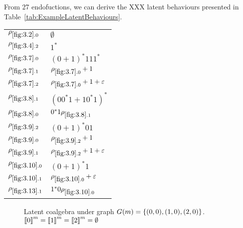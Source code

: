 \begin{example}
From 27 endofuctions, we can derive the XXX latent behaviours presented in Table~\ref{tab:ExampleLatentBehaviours}.
\begin{table}[t]
\centering
\begin{tabular}{|l | l | }
\hline
$\rho_{\ref{fig:3.2}.0}$ &  $\emptyset$   \\
$\rho_{\ref{fig:3.4}.2}$ &  $1^*$ \\
$\rho_{\ref{fig:3.7}.0}$ &  $(0+1)^*111^*$\\%
$\rho_{\ref{fig:3.7}.1}$ &  $\rho_{\ref{fig:3.7}.0}+1$ \\
$\rho_{\ref{fig:3.7}.2}$ &  $\rho_{\ref{fig:3.7}.0}+1+\varepsilon$ \\
$\rho_{\ref{fig:3.8}.1}$ &  $(00^*1+10^*1)^*$ \\
$\rho_{\ref{fig:3.8}.0}$ &  $0^*1\rho_{\ref{fig:3.8}.1}$ \\
$\rho_{\ref{fig:3.9}.2}$& $(0+1)^*01$\\
$\rho_{\ref{fig:3.9}.0}$&   $\rho_{\ref{fig:3.9}.2}+1$\\
$\rho_{\ref{fig:3.9}.1}$&   $\rho_{\ref{fig:3.9}.2}+1+\varepsilon$\\
$\rho_{\ref{fig:3.10}.0}$ &  $(0+1)^*1$ \\
$\rho_{\ref{fig:3.10}.1}$ &  $\rho_{\ref{fig:3.10}.0}+\varepsilon$ \\
$\rho_{\ref{fig:3.13}.1}$ &  $1^*0\rho_{\ref{fig:3.10}.0}$ \\
\end{tabular}
\end{table}

\begin{figure}[t]
\centering
{}
\caption{Latent coalgebra under graph $G(m)=\left\{(0,0),(1,0),(2,0)\right\}$. ${{{\llbracket0\rrbracket}}^{m}}={{{\llbracket1\rrbracket}}^{m}}={{{\llbracket2\rrbracket}}^{m}}=\emptyset$ }
\label{fig:3.2}


\end{figure}
\end{example}
